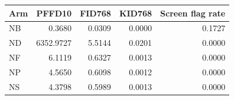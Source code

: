 \begin{tabular}{lrrrr}
\toprule
Arm & PFFD10 & FID768 & KID768 & Screen flag rate \\
\midrule
NB & 0.3680 & 0.0309 & 0.0000 & 0.1727 \\
ND & 6352.9727 & 5.5144 & 0.0201 & 0.0000 \\
NF & 6.1119 & 0.6327 & 0.0013 & 0.0000 \\
NP & 4.5650 & 0.6098 & 0.0012 & 0.0000 \\
NS & 4.3798 & 0.5989 & 0.0013 & 0.0000 \\
\bottomrule
\end{tabular}
